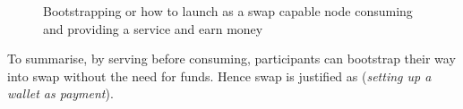\begin{center}
\begin{figure}
\begin{center}
\end{center}
\caption{Bootstrapping or how to launch as a swap capable node consuming and providing a
service  and earn money}
\label{fig:bootstrapping}
\end{figure}
\end{center}


To summarise, by serving before consuming, participants can bootstrap their way into swap without the need for funds. Hence swap is justified as (\emph{setting up a wallet as payment}).
